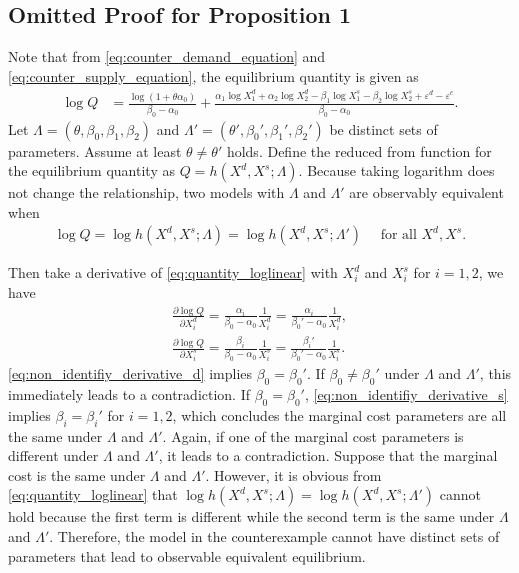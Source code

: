 \documentclass[11pt, a4paper]{article}
\theoremstyle{remark}
\begin{document}
\subsection{Omitted Proof for Proposition 1}\label{sec:omit_proof}

Note that from \eqref{eq:counter_demand_equation} and \eqref{eq:counter_supply_equation}, the equilibrium quantity is given as
\begin{align}
    \log Q &= \frac{ \log (1 + \theta \alpha_0 )}{\beta_0 - \alpha_0} + \frac{\alpha_1 \log X_{1}^{d} + \alpha_2 \log X_{2}^{d} - \beta_1 \log X_{1}^{s} - \beta_2 \log X_{2}^{s} + \varepsilon^{d} - \varepsilon^{c}}{\beta_0 - \alpha_0 }.\label{eq:quantity_loglinear}
\end{align}
Let $\Lambda = (\theta, \beta_0, \beta_1, \beta_2)$ and  $\Lambda' = (\theta', \beta_0', \beta_1', \beta_2')$ be distinct sets of parameters.
Assume at least $\theta\ne \theta'$ holds.
Define the reduced from function for the equilibrium quantity as $Q = h(X^d, X^s; \Lambda)$.
Because taking logarithm does not change the relationship, two models with $\Lambda$ and $\Lambda'$ are observably equivalent when
\begin{align}
    \log Q = \log h(X^d, X^s; \Lambda) = \log h(X^d, X^s; \Lambda') \quad \text{ for all } X^d, X^s.
\end{align}

Then take a derivative of \eqref{eq:quantity_loglinear} with $X^d_{i}$ and $X^s_{i}$ for $i = 1,2$, we have
\begin{align}
    \frac{\partial \log Q}{\partial X^{d}_i} = \frac{\alpha_i}{\beta_0 - \alpha_0} \frac{1}{X_{i}^d} =  \frac{\alpha_i}{\beta_0' - \alpha_0} \frac{1}{X_{i}^d} ,\label{eq:non_identifiy_derivative_d}\\
    \frac{\partial \log Q}{\partial X^{s}_i} = \frac{\beta_i}{\beta_0 - \alpha_0} \frac{1}{X_{i}^s} =  \frac{\beta_i'}{\beta_0' - \alpha_0} \frac{1}{X_{i}^s} .\label{eq:non_identifiy_derivative_s}
\end{align}
\eqref{eq:non_identifiy_derivative_d} implies $\beta_0 = \beta_0'$.
If $\beta_0 \ne \beta_0'$ under $\Lambda$ and $\Lambda'$, this immediately leads to a contradiction.
If $\beta_0 = \beta_0'$, \eqref{eq:non_identifiy_derivative_s} implies $\beta_i =\beta_i'$ for $i = 1,2$, which concludes the marginal cost parameters are all the same under $\Lambda$ and $\Lambda'$.
Again, if one of the marginal cost parameters is different under $\Lambda$ and $\Lambda'$, it leads to a contradiction.
Suppose that the marginal cost is the same under $\Lambda$ and $\Lambda'$.
However, it is obvious from \eqref{eq:quantity_loglinear} that $\log h(X^d, X^s; \Lambda) = \log h(X^d, X^s; \Lambda')$ cannot hold because the first term is different while the second term is the same under $\Lambda$ and $\Lambda'$.
Therefore, the model in the counterexample cannot have distinct sets of parameters that lead to observable equivalent equilibrium.
\end{document}
